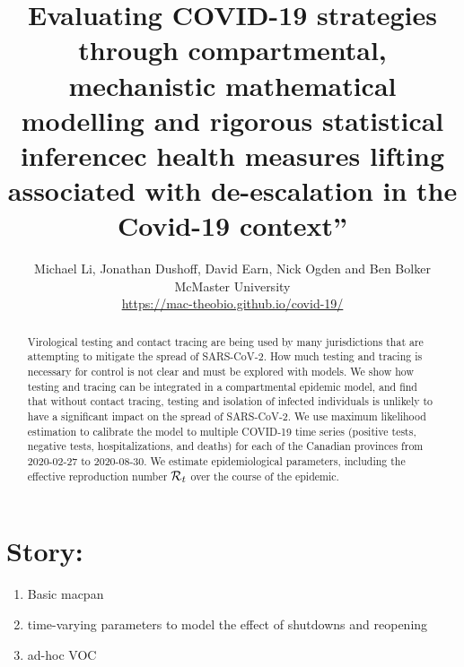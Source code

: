 \documentclass[12pt]{article}\usepackage[]{graphicx}\usepackage[]{color}
\title{Evaluating COVID-19 strategies
through compartmental, mechanistic mathematical modelling and rigorous
statistical inferencec health measures lifting associated with de-escalation in the Covid-19 context''
}
\author{Michael Li, Jonathan Dushoff, David Earn, Nick Ogden and Ben Bolker\\
  McMaster University\\
  \url{https://mac-theobio.github.io/covid-19/}
  }
\begin{document}
\linenumbers
\maketitle

\section*{Story:}
\begin{enumerate}
\item{Basic macpan}
\item{time-varying parameters to model the effect of shutdowns and reopening}
\item{ad-hoc VOC}
\end{enumerate}

\begin{abstract}
  Virological testing and contact tracing are being used by many
  jurisdictions that are attempting to mitigate the spread of
  SARS-CoV-2.  How much testing and tracing is necessary for control
  is not clear and must be explored with models.  We show how testing
  and tracing can be integrated in a compartmental epidemic model, and
  find that without contact tracing, testing and isolation of infected
  individuals is unlikely to have a significant impact on the spread
  of SARS-CoV-2.  We use maximum likelihood estimation to calibrate
  the model to multiple COVID-19 time series (positive tests, negative
  tests, hospitalizations, and deaths) for each of the Canadian
  provinces from 2020-02-27 to 2020-08-30.  We
  estimate epidemiological parameters, including the effective
  reproduction number ${\mathcal R}_t$ over the course of the epidemic.
\end{abstract}

\end{document}
